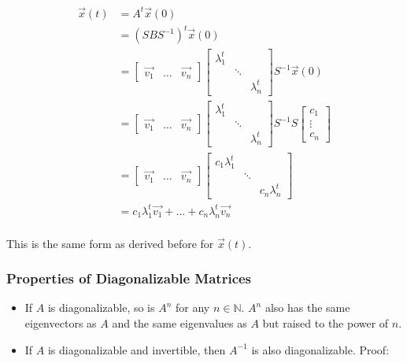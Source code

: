 \documentclass[12pt]{article}
\begin{document}
{\begin{align*}
    \vec{x}(t) &= A^t\vec{x}(0)\\
    &= (SBS^{-1})^t\vec{x}(0)\\
    &= \begin{bmatrix}
        \vec{v_1} & \dots & \vec{v_n}
    \end{bmatrix}\begin{bmatrix}
        \lambda_1^t & & \\
        & \ddots & \\
        & & \lambda_n^t
    \end{bmatrix}S^{-1} \vec{x}(0)\\
    &= \begin{bmatrix}
        \vec{v_1} & \dots & \vec{v_n}
    \end{bmatrix}\begin{bmatrix}
        \lambda_1^t & & \\
        & \ddots & \\
        & & \lambda_n^t
    \end{bmatrix}S^{-1}S\begin{bmatrix}
        c_1\\
        \vdots\\
        c_n
    \end{bmatrix}\\
    &= \begin{bmatrix}
        \vec{v_1} & \dots & \vec{v_n}
    \end{bmatrix}\begin{bmatrix}
       c_1 \lambda_1^t & & \\
        & \ddots & \\
        & & c_n\lambda_n^t
    \end{bmatrix}\\
    &= c_1 \lambda_1^t\vec{v_1} + \dots + c_n\lambda_n^t\vec{v_n}\\
\end{align*}

This is the same form as derived before for $\vec{x}(t)$.

\subsubsection{Properties of Diagonalizable Matrices}

\begin{itemize}
    \item If $A$ is diagonalizable, so is $A^n$ for any $n \in \mathbb{N}$. $A^n$ also has the same eigenvectors as $A$ and the same eigenvalues as $A$ but raised to the power of $n$.
    \item If $A$ is diagonalizable and invertible, then $A^{-1}$ is also diagonalizable. Proof:
    

\end{itemize}}
\end{document}
